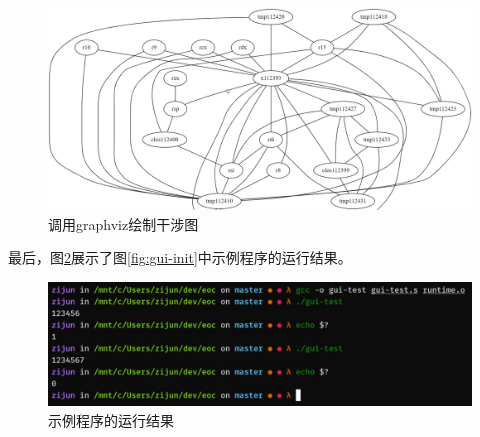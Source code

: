 \begin{figure}[h]
\centering
\includegraphics[width=\textwidth]{figures/gui-interf-graph.png}
\caption{调用graphviz绘制干涉图}
\label{fig:gui-interf-graph}
\end{figure}

最后，图\ref{fig:gui-result}展示了图\ref{fig:gui-init}中示例程序的运行结果。

\begin{figure}[h]
\centering
\includegraphics[width=\textwidth]{figures/gui-result.png}
\caption{示例程序的运行结果}
\label{fig:gui-result}
\end{figure}
